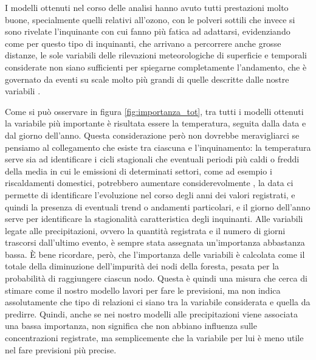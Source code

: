 \documentclass[a4paper]{report}
\begin{document}
I modelli ottenuti nel corso delle analisi hanno avuto tutti prestazioni molto buone, specialmente quelli relativi all'ozono, con le polveri sottili che invece si sono rivelate l'inquinante con cui fanno più fatica ad adattarsi, evidenziando come per questo tipo di inquinanti, che arrivano a percorrere anche grosse distanze, le sole variabili delle rilevazioni meteorologiche di superficie e temporali considerate non siano sufficienti per spiegarne completamente l'andamento, che è governato da eventi su scale molto più grandi di quelle descritte dalle nostre variabili \cite{grange2018random}. 

Come si può osservare in figura \ref{fig:importanza_tot}, tra tutti i modelli ottenuti la variabile più importante è risultata essere la temperatura, seguita dalla data e dal giorno dell'anno. Questa considerazione però non dovrebbe meravigliarci se pensiamo al collegamento che esiste tra ciascuna e l'inquinamento: la temperatura serve sia ad identificare i cicli stagionali che eventuali periodi più caldi o freddi della media in cui le emissioni di determinati settori, come ad esempio i riscaldamenti domestici, potrebbero aumentare considerevolmente
, la data ci permette di identificare l'evoluzione nel corso degli anni dei valori registrati, e quindi la presenza di eventuali trend o andamenti particolari, e il giorno dell'anno serve per identificare la stagionalità caratteristica degli inquinanti.  
Alle variabili legate alle precipitazioni, ovvero la quantità registrata e il numero di giorni trascorsi dall'ultimo evento, è sempre stata assegnata un'importanza abbastanza bassa. È bene ricordare, però, che l'importanza delle variabili è calcolata come il totale della diminuzione dell'impurità dei nodi della foresta, pesata per la probabilità di raggiungere ciascun nodo. Questa è quindi una misura che cerca di stimare come il nostro modello lavori per fare le previsioni, ma non indica assolutamente che tipo di relazioni ci siano tra la variabile considerata e quella da predirre. Quindi, anche se nei nostro modelli alle precipitazioni viene associata una bassa importanza, non significa che non abbiano influenza sulle concentrazioni registrate, ma semplicemente che la variabile per lui è meno utile nel fare previsioni più precise. 
\end{document}
